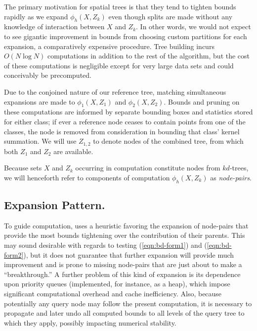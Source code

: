 \documentclass[twoside,leqno,twocolumn]{article}
\begin{document}
The primary motivation for spatial trees is that they tend to tighten
bounds rapidly as we expand $\phi_h(X,Z_k)$ even though splits are
made without any knowledge of interaction between $X$ and $Z_k$.  In
other words, we would not expect to see gigantic improvement in bounds
from choosing custom partitions for each expansion, a comparatively
expensive procedure.  Tree building incurs $O(N \log N)$ computations
in addition to the rest of the algorithm, but the cost of these
computations is negligible except for very large data sets and could
conceivably be precomputed.

Due to the conjoined nature of our reference tree, matching
simultaneous expansions are made to $\phi_1(X,Z_1)$ and
$\phi_2(X,Z_2)$.  Bounds and pruning on these computations are
informed by separate bounding boxes and statistics stored for either
class; if ever a reference node ceases to contain points from one of
the classes, the node is removed from consideration in bounding that
class' kernel summation.  We will use $Z_{1,2}$ to denote nodes of the
combined tree, from which both $Z_1$ and $Z_2$ are available.

Because sets $X$ and $Z_k$ occurring in computation constitute nodes
from $kd$-trees, we will henceforth refer to components of computation
$\phi_h(X,Z_k)$ as {\em node-pairs}.

\subsection{Expansion Pattern.}
To guide computation, \cite{nbc-compstat} uses a heuristic favoring
the expansion of node-pairs that provide the most bounds tightening
over the contribution of their parents.  This may sound desirable with
regards to testing (\ref{eqn:bd-form1}) and (\ref{eqn:bd-form2}), but
it does not guarantee that further expansion will provide much
improvement and is prone to missing node-pairs that are just about to
make a ``breakthrough.''  A further problem of this kind of expansion
is its dependence upon priority queues (implemented, for instance, as
a heap), which impose significant computational overhead and cache
inefficiency.  Also, because potentially any query node may follow the
present computation, it is necessary to propagate and later undo all
computed bounds to all levels of the query tree to which they apply,
possibly impacting numerical stability.
\end{document}
